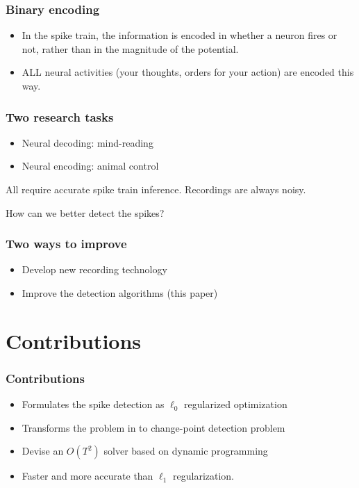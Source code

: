 \documentclass[20pt]{beamer}
\theoremstyle{definition}
\begin{document}
\begin{frame}
		\frametitle{Binary encoding}
		\begin{itemize}
			\item In the spike train, the information is encoded in whether a neuron fires or not, rather than in the magnitude of the potential.
			\item ALL neural activities (your thoughts, orders for your action) are encoded this way.
		\end{itemize}


\end{frame}

\begin{frame}
	\frametitle{Two research tasks}
	\begin{itemize}
		\item 	  
	Neural decoding: mind-reading
		
		\item Neural encoding: animal control
	\end{itemize}
		All  require accurate spike train inference.
	Recordings are always noisy.

\end{frame}

\begin{frame}
	How can we better detect the spikes?
	\frametitle{Two ways to improve}
	\begin{itemize}
		\item 	   Develop new recording technology
		
		\item Improve the detection algorithms (this paper)
	\end{itemize}

	
\end{frame}

\section{Contributions}
\begin{frame}
	\frametitle{Contributions}
\begin{itemize}
	\item Formulates the spike detection as $\ell_0$ regularized optimization
	\item Transforms the problem in to change-point detection problem
	\item Devise an $O(T^2)$ solver based on dynamic programming
	\item Faster and more accurate than $\ell_1$ regularization.
	\end{itemize}
\end{frame}
\end{document}
